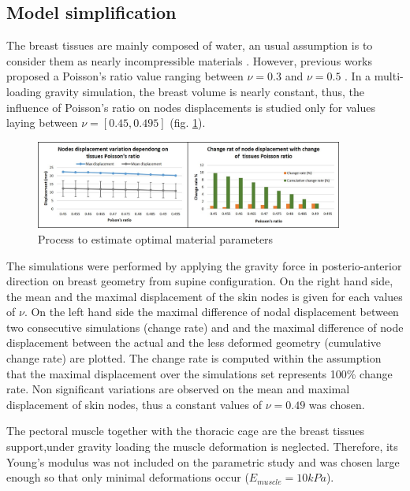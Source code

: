  \subsection{Model simplification}

The breast tissues are mainly composed of water, an usual assumption  is to consider them as nearly incompressible materials \citep{fung_biomechanics_2013}. However,
previous works proposed a Poisson's ratio value ranging between $\nu = 0.3$ \citep{hopp_automatic_2013} and $\nu = 0.5$ \citep{gamage_modelling_2012}. In a multi-loading gravity simulation, the breast volume is nearly constant, thus, the influence of  Poisson's ratio on nodes displacements is studied only for values laying between $\nu = [0.45 , 0.495]$ (fig. \ref{fig:poissonRatio}). 

\begin{figure}[!h]
\centering
\includegraphics[width=0.9\textwidth,keepaspectratio]{figures/poissonRatio.jpg} 
\caption{Process to estimate optimal material parameters}\label{fig:poissonRatio}
\end{figure}

The simulations were performed by applying the gravity force in posterio-anterior direction on breast geometry from supine configuration. On the right hand side, the mean and the maximal displacement of the skin nodes is given for each values of $\nu$. On the left hand side the maximal difference of nodal displacement between two consecutive simulations (change rate) and and the maximal difference of node displacement between the actual and the less deformed geometry (cumulative change rate) are plotted. The change rate is computed within the assumption that the maximal displacement over the simulations set represents 100\% change rate. Non significant variations are observed on the mean and maximal displacement of skin nodes, thus a constant values of $\nu = 0.49$ was chosen.


The pectoral muscle together with the thoracic cage are the breast tissues support,under gravity loading the muscle deformation is neglected. Therefore, its Young's modulus was not included on the parametric study and was chosen large enough so that only minimal deformations occur ($E_{muscle}=10kPa$).

